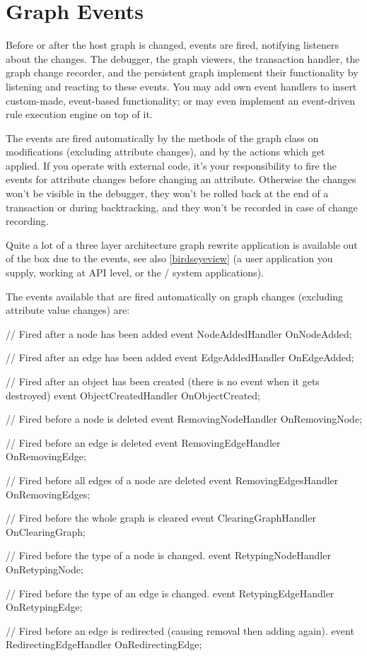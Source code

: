 \section{Graph Events}\label{sec:graphevent}

Before or after the host graph is changed, events are fired, notifying listeners about the changes.
The debugger, the graph viewers, the transaction handler, the graph change recorder, and the persistent graph implement their functionality by listening and reacting to these events.
You may add own event handlers to insert custom-made, event-based functionality;
or may even implement an event-driven rule execution engine on top of it.

The events are fired automatically by the methods of the graph class on modifications (excluding attribute changes),
and by the actions which get applied.
If you operate with external code, it's your responsibility to fire the events for attribute changes before changing an attribute.
Otherwise the changes won't be visible in the debugger, they won't be rolled back at the end of a transaction or during backtracking, and they won't be recorded in case of change recording.

Quite a lot of a three layer architecture graph rewrite application is available out of the box due to the events, see also \ref{birdseyeview} (a user application you supply, working at API level, or the \GrShell{}/\GGrShell{} system applications).

The events available that are fired automatically on graph changes (excluding attribute value changes) are:

\begin{csharplet}
// Fired after a node has been added
event NodeAddedHandler OnNodeAdded;

// Fired after an edge has been added
event EdgeAddedHandler OnEdgeAdded;

// Fired after an object has been created (there is no event when it gets destroyed)
event ObjectCreatedHandler OnObjectCreated;

// Fired before a node is deleted
event RemovingNodeHandler OnRemovingNode;

// Fired before an edge is deleted
event RemovingEdgeHandler OnRemovingEdge;

// Fired before all edges of a node are deleted
event RemovingEdgesHandler OnRemovingEdges;

// Fired before the whole graph is cleared
event ClearingGraphHandler OnClearingGraph;

// Fired before the type of a node is changed.
event RetypingNodeHandler OnRetypingNode;

// Fired before the type of an edge is changed.
event RetypingEdgeHandler OnRetypingEdge;

// Fired before an edge is redirected (causing removal then adding again).
event RedirectingEdgeHandler OnRedirectingEdge;
\end{csharplet}


